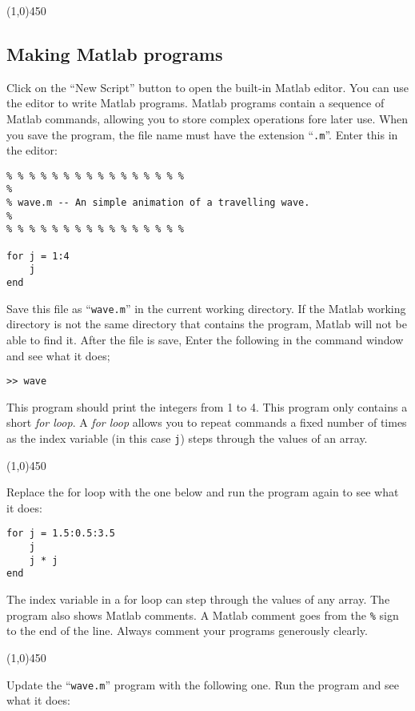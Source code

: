 \documentclass[12pt,a4paper]{article}   %
\newcommand{\code}[1]{\texttt{#1}}
\newcommand{\ruler}{
  \begin{center}
    \line(1,0){450}
  \end{center}
}
\begin{document}
\ruler

\subsection{Making Matlab programs}

Click on the ``New Script'' button to open the built-in Matlab editor. You can
use the editor to write Matlab programs. Matlab programs contain a sequence
of Matlab commands, allowing you to store complex operations fore later use.
When you save the program, the file name must have the extension ``\code{.m}''.
Enter this in the editor:

\begin{verbatim}
% % % % % % % % % % % % % % % %
% 
% wave.m -- An simple animation of a travelling wave.
% 
% % % % % % % % % % % % % % % %

for j = 1:4
    j
end
\end{verbatim}

Save this file as ``\code{wave.m}'' in the current working directory. If the Matlab working
directory is not the same directory that contains the program, Matlab will not be able to
find it. After the file is save, Enter the following in the command window and see what
it does;

\begin{verbatim}
>> wave
\end{verbatim}

This program should print the integers from 1 to 4. This program only contains a short
\textit{for loop}. A \textit{for loop} allows you to repeat commands a fixed number of
times as the index variable (in this case \code{j}) steps through the values of an array.


\ruler

Replace the for loop with the one below and run the program again to see what it does:

\begin{verbatim}
for j = 1.5:0.5:3.5
    j
    j * j
end
\end{verbatim}

The index variable in a for loop can step through the values of any array. The program
also shows Matlab comments. A Matlab comment goes from the \code{\%} sign to the end of
the line. Always comment your programs generously clearly.


\ruler

Update the ``\code{wave.m}'' program with the following one. Run the program and see
what it does:
\end{document}
